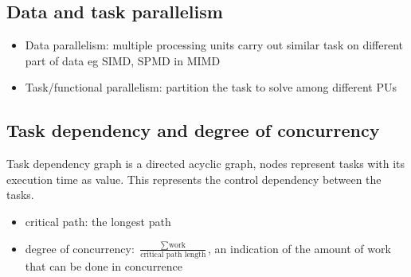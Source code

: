 \documentclass{article}
\begin{document}
\subsection{Data and task parallelism}
\begin{itemize}
    \item Data parallelism: multiple processing units carry out similar task on different part of data eg SIMD, SPMD in MIMD
    \item Task/functional parallelism: partition the task to solve among different PUs
\end{itemize}
\subsection{Task dependency and degree of concurrency}
Task dependency graph is a directed acyclic graph, nodes represent tasks with its execution time as value. This represents the control
dependency between the tasks. 
\begin{itemize}
    \item critical path: the longest path 
    \item degree of concurrency: $\frac{\sum \text{work}}{\text{critical path length}}$, an  indication of the amount of work that can be done in concurrence
\end{itemize}
\end{document}
